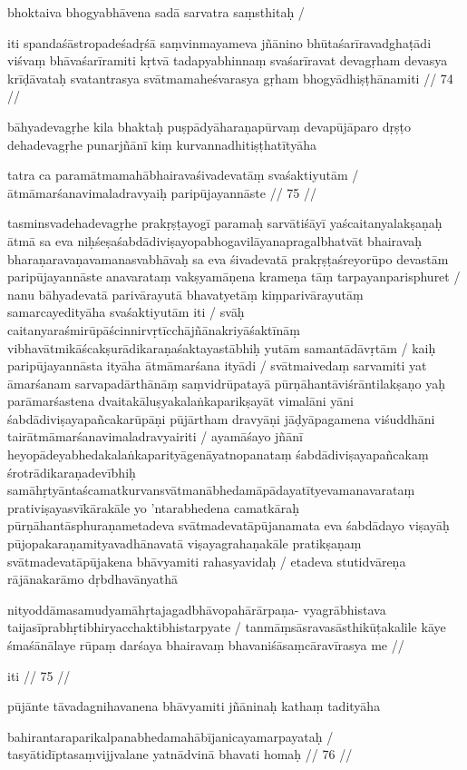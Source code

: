 bhoktaiva bhogyabhāvena sadā sarvatra saṃsthitaḥ  /

iti spandaśāstropadeśadṛśā saṃvinmayameva jñānino bhūtaśarīravadghaṭādi viśvaṃ bhāvaśarīramiti kṛtvā tadapyabhinnaṃ svaśarīravat devagṛham devasya krīḍāvataḥ svatantrasya svātmamaheśvarasya gṛham bhogyādhiṣṭhānamiti  // 74  //

bāhyadevagṛhe kila bhaktaḥ puṣpādyāharaṇapūrvaṃ devapūjāparo dṛṣṭo dehadevagṛhe punarjñānī kiṃ kurvannadhitiṣṭhatītyāha

tatra ca paramātmamahābhairavaśivadevatāṃ svaśaktiyutām  /
ātmāmarśanavimaladravyaiḥ paripūjayannāste  // 75  //

tasminsvadehadevagṛhe prakṛṣṭayogī paramaḥ sarvātiśāyī yaścaitanyalakṣaṇaḥ ātmā sa eva niḥśeṣaśabdādiviṣayopabhogavilāyanapragalbhatvāt bhairavaḥ bharaṇaravaṇavamanasvabhāvaḥ sa eva śivadevatā prakṛṣṭaśreyorūpo devastām paripūjayannāste anavarataṃ vakṣyamāṇena krameṇa tāṃ tarpayanparisphuret  / nanu bāhyadevatā parivārayutā bhavatyetāṃ kiṃparivārayutāṃ samarcayedityāha svaśaktiyutām iti  / svāḥ caitanyaraśmirūpāścinnirvṛtīcchājñānakriyāśaktīnāṃ vibhavātmikāścakṣurādikaraṇaśaktayastābhiḥ yutām samantādāvṛtām  / kaiḥ paripūjayannāsta ityāha ātmāmarśana ityādi  / svātmaivedaṃ sarvamiti yat āmarśanam sarvapadārthānāṃ saṃvidrūpatayā pūrṇāhantāviśrāntilakṣaṇo yaḥ parāmarśastena dvaitakāluṣyakalaṅkaparikṣayāt vimalāni yāni śabdādiviṣayapañcakarūpāṇi pūjārtham dravyāṇi jāḍyāpagamena viśuddhāni tairātmāmarśanavimaladravyairiti  / ayamāśayo jñānī heyopādeyabhedakalaṅkaparityāgenāyatnopanataṃ śabdādiviṣayapañcakaṃ śrotrādikaraṇadevībhiḥ samāhṛtyāntaścamatkurvansvātmanābhedamāpādayatītyevamanavarataṃ prativiṣayasvīkārakāle yo 'ntarabhedena camatkāraḥ pūrṇāhantāsphuraṇametadeva svātmadevatāpūjanamata eva śabdādayo viṣayāḥ pūjopakaraṇamityavadhānavatā viṣayagrahaṇakāle pratikṣaṇaṃ svātmadevatāpūjakena bhāvyamiti rahasyavidaḥ  / etadeva stutidvāreṇa rājānakarāmo dṛbdhavānyathā

nityoddāmasamudyamāhṛtajagadbhāvopahārārpaṇa-
     vyagrābhistava taijasīprabhṛtibhiryacchaktibhistarpyate  /
tanmāṃsāsravasāsthikūṭakalile kāye śmaśānālaye
     rūpaṃ darśaya bhairavaṃ bhavaniśāsaṃcāravīrasya me  //

iti  // 75  //

pūjānte tāvadagnihavanena bhāvyamiti jñāninaḥ kathaṃ tadityāha

bahirantaraparikalpanabhedamahābījanicayamarpayataḥ  /
tasyātidīptasaṃvijjvalane yatnādvinā bhavati homaḥ  // 76  //

